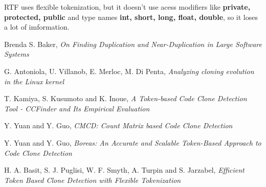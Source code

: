 \documentclass[conference]{IEEEtran}
\begin{document}
RTF uses flexible tokenization, but it doesn't use acess modifiers like \textbf{private, protected, public} and type names \textbf{int, short, long, float, double}, so it loses a lot of imformation.





%
%


\begin{thebibliography}{10}

Brenda S. Baker, \emph{On Finding Duplication and Near-Duplication in Large Software Systems}

G. Antoniola, U. Villanob, E. Merloc, M. Di Penta, \emph{Analyzing cloning evolution in the Linux kernel}

T. Kamiya, S. Kusumoto and K. Inoue, \emph{A Token-based Code Clone Detection Tool - CCFinder and Its Empirical Evaluation}

Y. Yuan and Y. Guo, \emph{CMCD: Count Matrix based Code Clone Detection}

Y. Yuan and Y. Guo, \emph{Boreas: An Accurate and Scalable Token-Based Approach to Code Clone Detection}

H. A. Basit, S. J. Puglisi, W. F. Smyth, A. Turpin and S. Jarzabel, \emph{Efficient Token Based Clone Detection with Flexible Tokenization}

\end{thebibliography}
\end{document}
